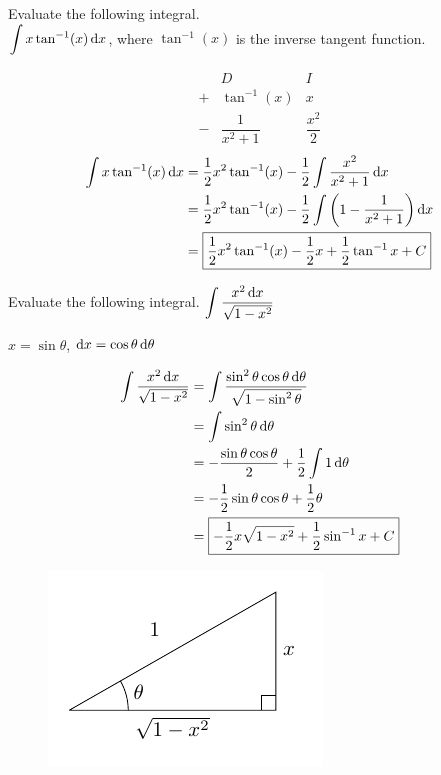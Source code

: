 \documentclass[12pt,answers]{exam}
\newcommand{\inv}{^{-1}}
\begin{document}
\begin{questions}

\question[10]
Evaluate the following integral.
\\
$\displaystyle \int x \tan\inv(x) \dif x$, where $\tan\inv(x)$ is the inverse tangent function.
\begin{solution}
    \[
    \begin{array}{ccc}
        & D & I \\ 
        + & \tan\inv(x) & x \\ 
        - & \dfrac{1}{x^2+1} & \dfrac{x^2}{2}
    \end{array}
    \]
    \begin{align*}
        \int x \tan\inv(x) \dif x
        &= \frac12 x^2 \tan\inv(x) - \frac 12 \int \frac{x^2}{x^2+1} \dif x \\ 
        &= \frac 12 x^2 \tan\inv(x) - \frac 12 \int \left(1- \frac{1}{x^2+1}\right) \dif x \\ 
        &= \boxed{\frac 12 x^2 \tan\inv(x) - \frac 12 x + \frac 12 \tan\inv x +C }
    \end{align*}
\end{solution}

\question[12]
Evaluate the following integral.
$\displaystyle \int \frac{x^2 \dif x}{\sqrt{1-x^2}}$
\begin{solution}
    $x = \sin \theta$, $\dif x = \cos \theta \dif \theta$
    \begin{multicols}{2}
    \begin{align*}
        \int \frac{x^2 \dif x}{\sqrt{1-x^2}}
        &= \int \frac{\sin^2 \theta \cos \theta \dif \theta}{\sqrt{1-\sin^2 \theta}} \\
        &= \int \sin^2 \theta \dif \theta \\
        &= - \frac{\sin \theta \cos \theta}{2} + \frac12 \int 1 \dif \theta \\
        &= -\frac12 \sin\theta\cos\theta + \frac12 \theta \\
        &= \boxed{- \frac 12 x \sqrt{1-x^2} + \frac12 \sin\inv x + C}
    \end{align*}
    \begin{figure}[H]
        \centering
        \includegraphics{graphics/2020-spring-final-2.pdf}
    \end{figure}
\end{multicols}
\end{solution}


\end{questions}
\end{document}
